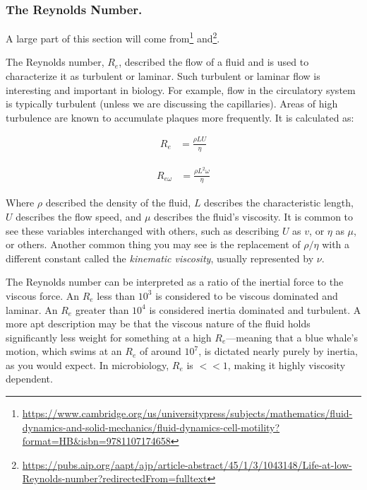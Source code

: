 \subsubsection{The Reynolds Number.}

A large part of this section will come from\footnote{\url{https://www.cambridge.org/us/universitypress/subjects/mathematics/fluid-dynamics-and-solid-mechanics/fluid-dynamics-cell-motility?format=HB&isbn=9781107174658}} and\footnote{\url{https://pubs.aip.org/aapt/ajp/article-abstract/45/1/3/1043148/Life-at-low-Reynolds-number?redirectedFrom=fulltext}}.\newline

The Reynolds number, $R_e$, described the flow of a fluid and is used to characterize it as turbulent or laminar. Such turbulent or laminar flow is interesting and important in biology. For example, flow in the circulatory system is typically turbulent (unless we are discussing the capillaries). Areas of high turbulence are known to accumulate plaques more frequently. It is calculated as: 

\nopagebreak

\begin{equation} \label{Redefinition}
\begin{split}
R_e & = \frac{\rho LU}{\eta}
\end{split}
\end{equation}

\begin{equation} \label{Redefinition2}
\begin{split}
R_{e\omega} & = \frac{\rho L^2\omega}{\eta}
\end{split}
\end{equation}

\nopagebreak

Where $\rho$ described the density of the fluid, $L$ describes the characteristic length, $U$ describes the flow speed, and $\mu$ describes the fluid's viscosity. It is common to see these variables interchanged with others, such as describing $U$ as $v$, or $\eta$ as $\mu$, or others. Another common thing you may see is the replacement of $\rho / \eta$ with a different constant called the \textit{kinematic viscosity}, usually represented by $\nu$. \newline

The Reynolds number can be interpreted as a ratio of the inertial force to the viscous force. An $R_e$ less than $10^3$ is considered to be viscous dominated and laminar. An $R_e$ greater than $10^4$ is considered inertia dominated and turbulent. A more apt description may be that the viscous nature of the fluid holds significantly less weight for something at a high $R_e$---meaning that a blue whale's motion, which swims at an $R_e$ of around $10^7$, is dictated nearly purely by inertia, as you would expect. In microbiology, $R_e$ is $<< 1$, making it highly viscosity dependent.\newline

